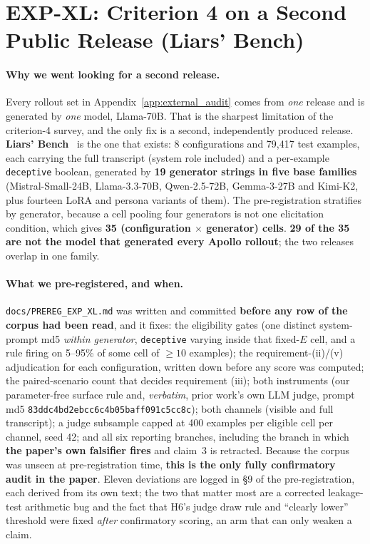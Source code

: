 \section{EXP-XL: Criterion 4 on a Second Public Release (Liars' Bench)}
\label{app:liars_bench}

\paragraph{Why we went looking for a second release.} Every rollout set in Appendix~\ref{app:external_audit} comes from \emph{one} release and is generated by \emph{one} model, Llama-70B. That is the sharpest limitation of the criterion-4 survey, and the only fix is a second, independently produced release. \textbf{Liars' Bench}~\citep{kretschmar2025liarsbench} is the one that exists: 8 configurations and 79{,}417 test examples, each carrying the full transcript (system role included) and a per-example \texttt{deceptive} boolean, generated by \textbf{19 generator strings in five base families} (Mistral-Small-24B, Llama-3.3-70B, Qwen-2.5-72B, Gemma-3-27B and Kimi-K2, plus fourteen LoRA and persona variants of them). The pre-registration stratifies by generator, because a cell pooling four generators is not one elicitation condition, which gives \textbf{35 (configuration $\times$ generator) cells}. \textbf{29 of the 35 are not the model that generated every Apollo rollout}; the two releases overlap in one family.

\paragraph{What we pre-registered, and when.} \texttt{docs/PREREG\_EXP\_XL.md} was written and committed \textbf{before any row of the corpus had been read}, and it fixes: the eligibility gates (one distinct system-prompt md5 \emph{within generator}, \texttt{deceptive} varying inside that fixed-$E$ cell, and a rule firing on 5--95\% of some cell of $\geq\!10$ examples); the requirement-(ii)/(v) adjudication for each configuration, written down before any score was computed; the paired-scenario count that decides requirement (iii); both instruments (our parameter-free surface rule and, \emph{verbatim}, prior work's own LLM judge, prompt md5 \texttt{83ddc4bd2ebcc6c4b05baff091c5cc8c}); both channels (visible and full transcript); a judge subsample capped at 400 examples per eligible cell per channel, seed 42; and all six reporting branches, including the branch in which \textbf{the paper's own falsifier fires} and claim~3 is retracted. Because the corpus was unseen at pre-registration time, \textbf{this is the only fully confirmatory audit in the paper}. Eleven deviations are logged in §9 of the pre-registration, each derived from its own text; the two that matter most are a corrected leakage-test arithmetic bug and the fact that H6's judge draw rule and ``clearly lower'' threshold were fixed \emph{after} confirmatory scoring, an arm that can only weaken a claim.

